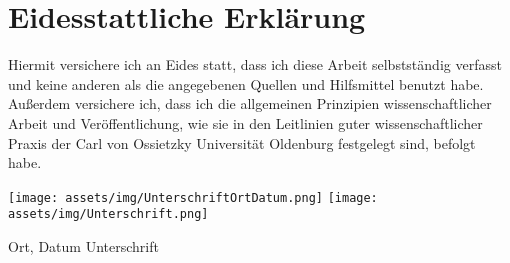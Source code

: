 \chapter*{Eidesstattliche Erklärung}

Hiermit versichere ich an Eides statt, dass ich diese Arbeit selbstständig verfasst und keine anderen als die angegebenen Quellen und Hilfsmittel benutzt habe. Außerdem versichere ich, dass ich die allgemeinen Prinzipien wissenschaftlicher Arbeit und Veröffentlichung, wie sie in den Leitlinien guter wissenschaftlicher Praxis der Carl von Ossietzky Universität Oldenburg festgelegt sind, befolgt habe.
\vspace{2cm}

\hspace{1cm} \texttt{[image: assets/img/UnterschriftOrtDatum.png]}  \hfill \texttt{[image: assets/img/Unterschrift.png]} 
 \hspace{1.3cm}

\hspace{2cm} Ort, Datum \hfill Unterschrift \hspace{2cm}